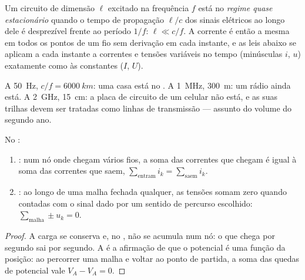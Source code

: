 \begin{definition}\label{def:b1:dc-circuits:arqs}
Um circuito de dimensão $\ell$ excitado na frequência $f$ está no
\emph{regime quase estacionário} quando o tempo de propagação $\ell/c$ dos
sinais elétricos ao longo dele é desprezível frente ao período $1/f$:
$\ell \ll c/f$. A corrente é então a mesma em todos os pontos de um
fio sem derivação em cada instante, e as leis abaixo se aplicam a cada
instante a correntes e tensões variáveis no tempo (minúsculas $i$, $u$)
exatamente como às constantes ($I$, $U$).
\end{definition}

\begin{example}\label{ex:b1:dc-circuits:arqs}
A \qty{50}{Hz}, $c/f = \qty{6000}{km}$: uma casa está no . A \qty{1}{MHz}, \qty{300}{m}: um rádio ainda está. A \qty{2}{GHz},
\qty{15}{cm}: a placa de circuito de um celular não está, e as suas trilhas devem ser
tratadas como linhas de transmissão --- assunto do volume do segundo ano.
\end{example}

\begin{theorem}\label{thm:b1:dc-circuits:kirchhoff}
No :
\begin{enumerate}
  \item \emph{}: num nó onde chegam vários fios, a soma das
        correntes que chegam é igual à soma das correntes que saem,
        $\sum_{\text{entram}} i_k = \sum_{\text{saem}} i_k$.
  \item \emph{}: ao longo de uma malha fechada qualquer, as tensões somam
        zero quando contadas com o sinal dado por um sentido de percurso
        escolhido: $\sum_{\text{malha}} \pm u_k = 0$.
\end{enumerate}
\end{theorem}

\begin{proof}
A carga se conserva e, no , não se acumula
num nó: o que chega por segundo sai por segundo. A  é
a afirmação de que o potencial é uma função da posição: ao percorrer
uma malha e voltar ao ponto de partida, a soma das quedas de
potencial vale $V_A - V_A = 0$.
\end{proof}

